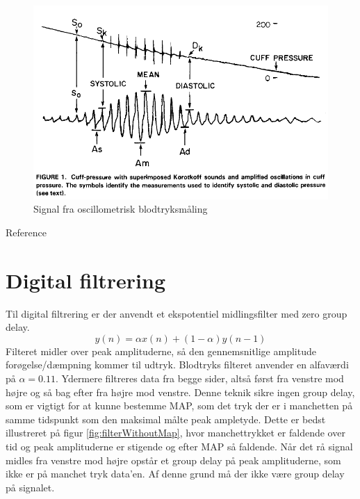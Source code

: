 \begin{figure}[H]
	\includegraphics[width=\textwidth]{billeder/OptimalBlodtryksmaling.png}
	\caption{Signal fra oscillometrisk blodtryksmåling }\label{fig:goodMeasurement}
\end{figure}
Reference 

\section{Digital filtrering} \label{title:digitalFilter}
Til digital filtrering er der anvendt et ekspotentiel midlingsfilter med zero group delay.
\begin{equation}
	y(n) = \alpha x(n)+(1-\alpha )y(n-1)
\end{equation}
Filteret midler over peak amplituderne, så den gennemsnitlige amplitude forøgelse/dæmpning kommer til udtryk. Blodtryks filteret anvender en alfaværdi på $\alpha = 0.11$. Ydermere filtreres data fra begge sider, altså først fra venstre mod højre og så bag efter fra højre mod venstre. Denne teknik sikre ingen group delay, som er vigtigt for at kunne bestemme MAP, som det tryk der er i manchetten på samme tidspunkt som den maksimal målte peak ampletyde. Dette er bedst illustreret på figur \ref{fig:filterWithoutMap}, hvor manchettrykket er faldende over tid og peak amplituderne er stigende og efter MAP så faldende. Når det rå signal midles fra venstre mod højre opstår et group delay på peak amplituderne, som ikke er på manchet tryk data'en. Af denne grund må der ikke være group delay på signalet.

